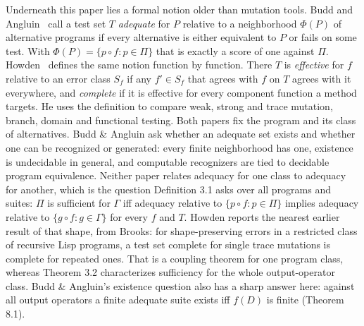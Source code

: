 \documentclass[conference]{IEEEtran}
\theoremstyle{run}
\begin{document}
Underneath this paper lies a formal notion older than mutation tools. Budd and Angluin~\cite{budd1982} call a test set $T$ \emph{adequate} for $P$ relative to a neighborhood $\Phi(P)$ of alternative programs if every alternative is either equivalent to $P$ or fails on some test. With $\Phi(P) = \{p \circ f : p \in \Pi\}$ that is exactly a score of one against $\Pi$. Howden~\cite{howden1982} defines the same notion function by function. There $T$ is \emph{effective} for $f$ relative to an error class $S_f$ if any $f' \in S_f$ that agrees with $f$ on $T$ agrees with it everywhere, and \emph{complete} if it is effective for every component function a method targets. He uses the definition to compare weak, strong and trace mutation, branch, domain and functional testing. Both papers fix the program and its class of alternatives. Budd \& Angluin ask whether an adequate set exists and whether one can be recognized or generated: every finite neighborhood has one, existence is undecidable in general, and computable recognizers are tied to decidable program equivalence. Neither paper relates adequacy for one class to adequacy for another, which is the question Definition 3.1 asks over all programs and suites: $\Pi$ is sufficient for $\Gamma$ iff adequacy relative to $\{p \circ f : p \in \Pi\}$ implies adequacy relative to $\{g \circ f : g \in \Gamma\}$ for every $f$ and $T$. Howden reports the nearest earlier result of that shape, from Brooks: for shape-preserving errors in a restricted class of recursive Lisp programs, a test set complete for single trace mutations is complete for repeated ones. That is a coupling theorem for one program class, whereas Theorem 3.2 characterizes sufficiency for the whole output-operator class. Budd \& Angluin's existence question also has a sharp answer here: against all output operators a finite adequate suite exists iff $f(D)$ is finite (Theorem 8.1).
\end{document}
